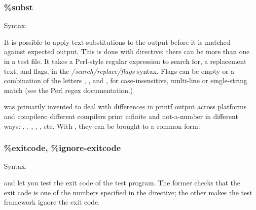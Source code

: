 \subsubsection{\%subst}
\label{sec:testing:opptest:subst}

Syntax:

\begin{filelisting}
\end{filelisting}

It is possible to apply text substitutions to the output before it is
matched against expected output. This is done with 
directive; there can be more than one  in a test file. It
takes a Perl-style regular expression to search for, a replacement text,
and flags, in the \textit{/search/replace/flags} syntax. Flags can be empty
or a combination of the letters , , and , for
case-insensitive, multi-line or single-string match (see the Perl regex
documentation.)

 was primarily invented to deal with differences in printf
output across platforms and compilers: different compilers print infinite
and not-a-number in different ways: , , ,
, ,  etc. With , they can be
brought to a common form:

\begin{filelisting}
\end{filelisting}

\subsubsection{\%exitcode, \%ignore-exitcode}
\label{sec:testing:opptest:exitcode}

Syntax:
\begin{filelisting}
\end{filelisting}

\begin{filelisting}
\end{filelisting}

 and  let you test the exit code of the
test program. The former checks that the exit code is one of the numbers specified in
the directive; the other makes the test framework ignore the exit code.

